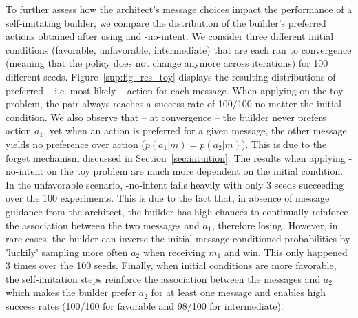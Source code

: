 To further assess how the architect's message choices impact the performance of a self-imitating builder, we compare the distribution of the builder's preferred actions obtained after using \abig and \abig-no-intent. We consider three different initial conditions (favorable, unfavorable, intermediate) that are each ran to convergence (meaning that the policy does not change anymore across iterations) for 100 different seeds.  Figure~\ref{sup:fig_res_toy} displays the resulting distributions of preferred -- i.e. most likely -- action for each message. When applying \abig on the toy problem, the pair always reaches a success rate of 100/100 no matter the initial condition. We also observe that -- at convergence -- the builder never prefers action $a_1$, yet when an action is preferred for a given message, the other message yields no preference over action ($p(a_1|m)=p(a_2|m)$). This is due to the forget mechanism discussed in Section~\ref{sec:intuition}. The results when applying \abig-no-intent on the toy problem are much more dependent on the initial condition. In the unfavorable scenario, \abig-no-intent fails heavily with only 3 seeds succeeding over the 100 experiments. This is due to the fact that, in absence of message guidance from the architect, the builder has high chances to continually reinforce the association between the two messages and $a_1$, therefore losing. However, in rare cases, the builder can inverse the initial message-conditioned probabilities by 'luckily' sampling more often $a_2$ when receiving $m_1$ and win. This only happened 3 times over the 100 seeds. Finally, when initial conditions are more favorable, the self-imitation  steps reinforce the association between the messages and $a_2$ which makes the builder prefer $a_2$ for at least one message and enables high success rates (100/100 for favorable and 98/100 for intermediate).
%

